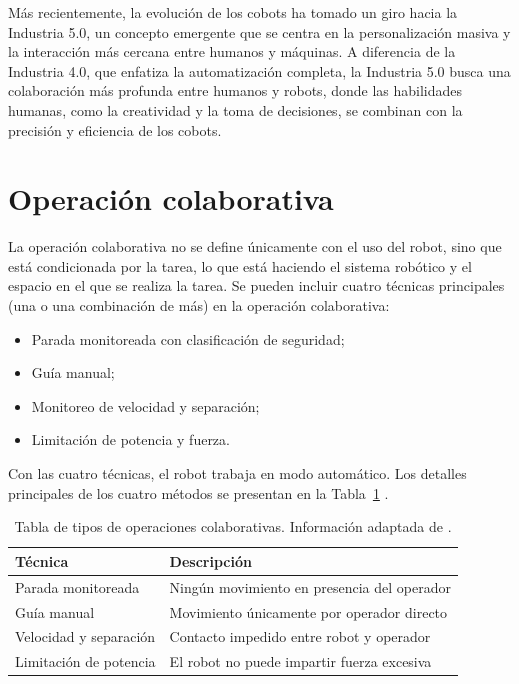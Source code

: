 Más recientemente, la evolución de los cobots ha tomado un giro hacia la Industria 5.0, un concepto emergente que se centra en la personalización masiva y la interacción más cercana entre humanos y máquinas. A diferencia de la Industria 4.0, que enfatiza la automatización completa, la Industria 5.0 busca una colaboración más profunda entre humanos y robots, donde las habilidades humanas, como la creatividad y la toma de decisiones, se combinan con la precisión y eficiencia de los cobots.

\section{Operación colaborativa}

La operación colaborativa no se define únicamente con el uso del robot, sino que está condicionada por la tarea, lo que está haciendo el sistema robótico y el espacio en el que se realiza la tarea. Se pueden incluir cuatro técnicas principales (una o una combinación de más) en la operación colaborativa:
\begin{itemize}
  \item Parada monitoreada con clasificación de seguridad;
  \item Guía manual;
  \item Monitoreo de velocidad y separación;
  \item Limitación de potencia y fuerza.
\end{itemize}

Con las cuatro técnicas, el robot trabaja en modo automático. Los detalles principales de los cuatro métodos se presentan en la Tabla~\ref{tab:operaciones-colab} \cite{lenarcic2012}.

\begin{table}[htbp]
  \centering
  \caption{Tabla de tipos de operaciones colaborativas. Información adaptada de \cite{lenarcic2012}.}
  \label{tab:operaciones-colab}
  \begin{tabular}{ll}
    \toprule
    Técnica & Descripción \\
    \midrule
    Parada monitoreada & Ningún movimiento en presencia del operador \\
    Guía manual & Movimiento únicamente por operador directo \\
    Velocidad y separación & Contacto impedido entre robot y operador \\
    Limitación de potencia & El robot no puede impartir fuerza excesiva \\
    \bottomrule
  \end{tabular}
\end{table}

